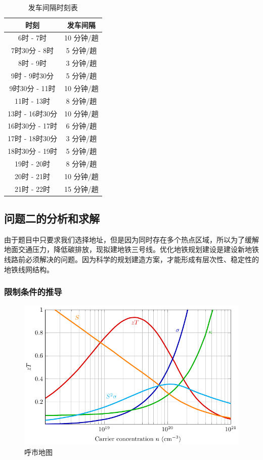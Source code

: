 \documentclass[12pt,a4paper]{mcmthesis}
\begin{document}
    \begin{table}[h]
        \centering
        \caption{发车间隔时刻表}
        \label{tab:p1_interval}
        \begin{tabular}{c|c}
            \hline
            时刻           & 发车间隔    \\ \hline
            6时 - 7时      & 10 分钟/趟 \\
            7时30分 - 8时   & 5 分钟/趟  \\
            8时 - 9时      & 3 分钟/趟  \\
            9时 - 9时30分   & 5 分钟/趟  \\
            9时30分 - 11时  & 10 分钟/趟 \\
            11时 - 13时    & 8 分钟/趟  \\
            13时 - 16时30分 & 10 分钟/趟 \\
            16时30分 - 17时 & 6 分钟/趟  \\
            17时 - 18时30分 & 3 分钟/趟  \\
            18时30分 - 19时 & 5 分钟/趟  \\
            19时 - 20时    & 8 分钟/趟  \\
            20时 - 21时    & 10 分钟/趟 \\
            21时 - 22时    & 15 分钟/趟 \\
        \end{tabular}
    \end{table}

    \subsection{问题二的分析和求解}
    由于题目中只要求我们选择地址，但是因为同时存在多个热点区域，所以为了缓解地面交通压力，降低碳排放，现拟建地铁三号线。优化地铁规划建设是建设新地铁线路前必须解决的问题。因为科学的规划建造方案，才能形成有层次性、稳定性的地铁线网结构。

    \subsubsection{限制条件的推导}
    \begin{figure}[h!t]
        \centerline{\includegraphics[scale=0.6]{figures/fig1}\quad}
        \caption{\song\wuhao 呼市地图}
        \label{fig:呼市地图}
    \end{figure}
\end{document}
